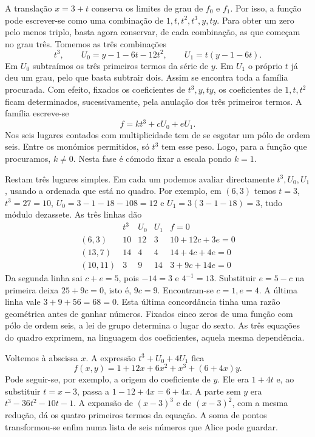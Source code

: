 A translação \(x=3+t\) conserva os limites de grau de \(f_0\)
e \(f_1\). Por isso, a função pode escrever-se como uma combinação
de \(1,t,t^2,t^3,y,ty\). Para obter um zero pelo menos triplo,
basta agora conservar, de cada combinação, as que começam no grau
três. Tomemos as três combinações
\[
 t^3,\qquad
 U_0=y-1-6t-12t^2,\qquad
 U_1=t(y-1-6t).
\]
Em \(U_0\) subtraímos os três primeiros termos da série de \(y\).
Em \(U_1\) o próprio \(t\) já deu um grau, pelo que basta
subtrair dois. Assim se encontra toda a família procurada. Com
efeito, fixados os coeficientes de \(t^3,y,ty\), os coeficientes
de \(1,t,t^2\) ficam determinados, sucessivamente, pela anulação
dos três primeiros termos. A família escreve-se
\[
                       f=k t^3+c U_0+e U_1.
\]
Nos seis lugares contados com multiplicidade tem de se esgotar um
pólo de ordem seis. Entre os monómios permitidos, só \(t^3\) tem
esse peso. Logo, para a função que procuramos, \(k\ne0\). Nesta
fase é cómodo fixar a escala pondo \(k=1\).

Restam três lugares simples. Em cada um podemos avaliar directamente
\(t^3,U_0,U_1\), usando a ordenada que está no quadro. Por exemplo,
em \((6,3)\) temos \(t=3\), \(t^3=27=10\),
\(U_0=3-1-18-108=12\) e \(U_1=3(3-1-18)=3\),
tudo módulo dezassete. As três linhas dão
\[
\begin{array}{c|rrr|l}
 &t^3&U_0&U_1& f=0\\ \hline
 (6,3)   &10&12&3 & 10+12c+3e=0\\
 (13,7)  &14& 4&4 & 14+4c+4e=0\\
 (10,11) & 3& 9&14& 3+9c+14e=0
\end{array}
\]
Da segunda linha sai \(c+e=5\), pois \(-14=3\) e
\(4^{-1}=13\). Substituir \(e=5-c\) na primeira deixa
\(25+9c=0\), isto é, \(9c=9\). Encontram-se \(c=1,e=4\).
A última linha vale \(3+9+56=68=0\). Esta última concordância
tinha uma razão geométrica antes de ganhar números. Fixados cinco
zeros de uma função com pólo de ordem seis, a lei de grupo
determina o lugar do sexto. As três equações do quadro exprimem,
na linguagem dos coeficientes, aquela mesma dependência.

Voltemos à abscissa \(x\). A expressão \(t^3+U_0+4U_1\) fica
\begin{equation}
 f(x,y)=1+12x+6x^2+x^3+(6+4x)y.
 \label{eq:divisors-six-polynomial}
\end{equation}
Pode seguir-se, por exemplo, a origem do coeficiente de \(y\).
Ele era \(1+4t\) e, ao substituir \(t=x-3\), passa a
\(1-12+4x=6+4x\). A parte sem \(y\) era
\(t^3-36t^2-10t-1\). A expansão de \((x-3)^3\) e de
\((x-3)^2\), com a mesma redução, dá os quatro primeiros termos
da equação. A soma de pontos transformou-se enfim numa lista
de seis números que Alice pode guardar.


